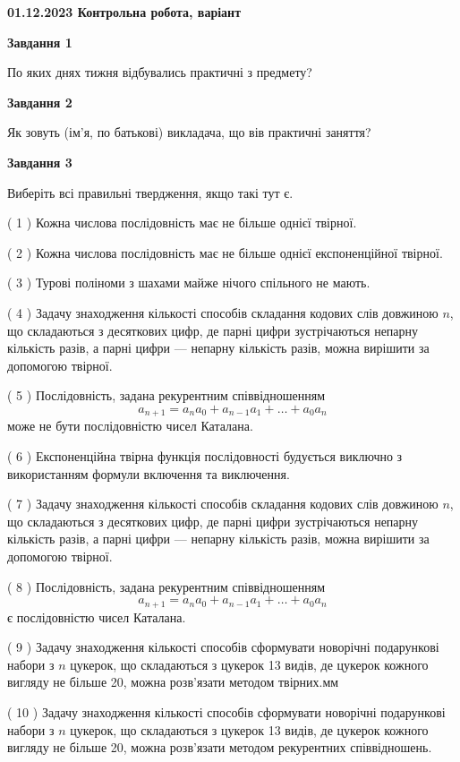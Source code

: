 \documentclass[12pt, ukrainian]{article}
\begin{document}
\begin {large}

\textbf{01.12.2023 Контрольна робота, варіант  }\par


{
{\begin {center}\textbf{Завдання 1}\end {center}}\par
По яких днях тижня відбувались практичні з предмету?\par
{\begin {center}\textbf{Завдання 2}\end {center}}\par
Як зовуть (ім'я, по батькові) викладача, що вів практичні заняття?\par
{\begin {center}\textbf{Завдання 3}\end {center}}\par
Виберіть всі правильні твердження, якщо такі тут є.\par
\vspace{2mm}
( 1 ) Кожна числова послідовність має не більше однієї твірної.%

( 2 ) Кожна числова послідовність має не більше однієї  експоненційної твірної.%

( 3 ) Турові поліноми з шахами майже нічого спільного не мають.%

( 4 ) Задачу знаходження кількості способів складання кодових слів довжиною $n$, що складаються з десяткових цифр, де парні цифри зустрічаються непарну кількість разів, а парні цифри — непарну кількість разів, можна вирішити за допомогою твірної.%

( 5 ) Послідовність, задана рекурентним співвідношенням $$a_{n+1}=a_{n}a_{0}+a_{n-1}a_{1}+\ldots+a_0a_{n}$$ може не бути послідовністю чисел Каталана.%

( 6 ) Експоненційна твірна функція послідовності будується виключно з використанням формули включення та виключення.%

( 7 ) Задачу знаходження кількості способів складання кодових слів довжиною $n$, що складаються з десяткових цифр, де парні цифри зустрічаються непарну кількість разів, а парні цифри — непарну кількість разів, можна вирішити за допомогою твірної.%

( 8 ) Послідовність, задана рекурентним співвідношенням $$a_{n+1}=a_{n}a_{0}+a_{n-1}a_{1}+\ldots+a_0a_{n}$$ є послідовністю чисел Каталана.%

( 9 ) Задачу знаходження кількості способів сформувати новорічні подарункові набори з $n$ цукерок, що складаються з цукерок 13 видів, де цукерок кожного вигляду не більше 20, можна розв’язати методом твірних.мм%

( 10 ) Задачу знаходження кількості способів сформувати новорічні подарункові набори з $n$ цукерок, що складаються з цукерок 13 видів, де цукерок кожного вигляду не більше 20, можна розв’язати методом рекурентних співвідношень.%
}
\end {large}

\vspace{4mm}
\newpage
\end{document}
